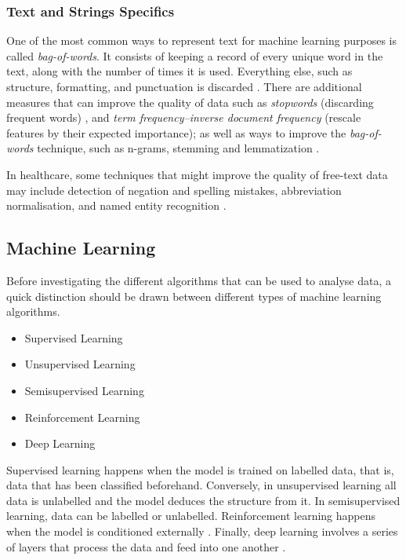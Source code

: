 \documentclass[a4paper,12pt]{article}
\begin{document}
\subsubsection{Text and Strings Specifics}

One of the most common ways to represent text for machine learning purposes is called \textit{bag-of-words}.
It consists of keeping a record of every unique word in the text, along with the number of times it is used.
Everything else, such as structure, formatting, and punctuation is discarded \parencite[327]{Mueller2017}.
There are additional measures that can improve the quality of data such as \textit{stopwords} (discarding frequent words) \parencite[327-336]{Mueller2017}, and \textit{term frequency–inverse document frequency} (rescale features by their expected importance);
as well as ways to improve the \textit{bag-of-words} technique, such as n-grams, stemming and lemmatization \parencite[339,344]{Mueller2017}.

In healthcare, some techniques that might improve the quality of free-text data may include detection of negation and spelling mistakes, abbreviation normalisation, and named entity recognition \parencite{Dalianis2015}.

\subsection{Machine Learning}

Before investigating the different algorithms that can be used to analyse data, a quick distinction should be drawn between different types of machine learning algorithms.

\begin{itemize}
 \item Supervised Learning
 \item Unsupervised Learning
 \item Semisupervised Learning
 \item Reinforcement Learning
 \item Deep Learning
\end{itemize}

Supervised learning happens when the model is trained on labelled data, that is, data that has been classified beforehand.
Conversely, in unsupervised learning all data is unlabelled and the model deduces the structure from it. In semisupervised learning, data can be labelled or unlabelled.
Reinforcement learning happens when the model is conditioned externally \parencite[11]{Ibrahim2021}.
Finally, deep learning involves a series of layers that process the data and feed into one another \parencite[13]{Ibrahim2021}.
\end{document}
